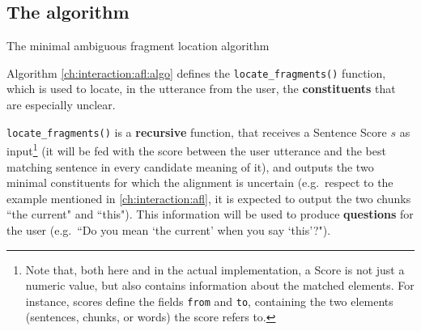 \subsection{The algorithm}
\begin{algorithm}

  
\caption{The minimal ambiguous fragment location algorithm\label{ch:interaction:afl:algo}}
\end{algorithm}

Algorithm \ref{ch:interaction:afl:algo} defines the \texttt{locate\_fragments()} function, which is used to locate, in the utterance from the user, the \textbf{constituents} that are especially unclear.

\texttt{locate\_fragments()} is a \textbf{recursive} function, that receives a Sentence Score $s$ as input\footnote{Note that, both here and in the actual implementation, a Score is not just a numeric value, but also contains information about the matched elements. For instance, scores define the fields \texttt{from} and \texttt{to}, containing the two elements (sentences, chunks, or words) the score refers to.} (it will be fed with the score between the user utterance and the best matching sentence in every candidate meaning of it), and outputs the two minimal constituents for which the alignment is uncertain (e.g.\ respect to the example mentioned in \ref{ch:interaction:afl}, it is expected to output the two chunks ``the current" and ``this"). This information will be used to produce \textbf{questions} for the user (e.g.\ ``Do you mean `the current' when you say `this'?").

